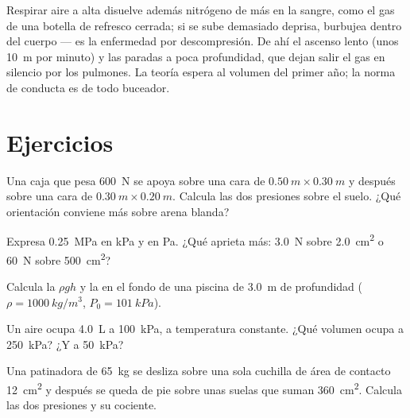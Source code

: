 \begin{remark}[La descompresión]\label{rem:g10:pressure:deco}
Respirar aire a alta  disuelve además nitrógeno de más en la
sangre, como el gas de una botella de refresco cerrada; si se sube
demasiado deprisa, burbujea dentro del cuerpo --- es la enfermedad por
descompresión. De ahí el ascenso lento (unos \qty{10}{m} por minuto) y
las paradas a poca profundidad, que dejan salir el gas en silencio por
los pulmones. La teoría espera al volumen del primer año; la norma de
conducta es de todo buceador.
\end{remark}

\section{Ejercicios}

\begin{exercise}[$\star$]\label{exo:g10:pressure:1}
Una caja que pesa \qty{600}{N} se apoya sobre una cara de
$\qty{0.50}{m} \times \qty{0.30}{m}$ y después sobre una cara de
$\qty{0.30}{m} \times \qty{0.20}{m}$. Calcula las dos presiones sobre el
suelo. ¿Qué orientación conviene más sobre arena blanda?
\end{exercise}

\begin{exercise}[$\star$]\label{exo:g10:pressure:2}
Expresa \qty{0.25}{MPa} en \unit{kPa} y en \unit{Pa}. ¿Qué aprieta más:
\qty{3.0}{N} sobre \qty{2.0}{cm^2} o \qty{60}{N} sobre
\qty{500}{cm^2}?
\end{exercise}

\begin{exercise}[$\star$]\label{exo:g10:pressure:3}
Calcula la  $\rho g h$ y la  en el
fondo de una piscina de \qty{3.0}{m} de profundidad
($\rho = \qty{1000}{kg/m^3}$, $P_0 = \qty{101}{kPa}$).
\end{exercise}

\begin{exercise}[$\star$]\label{exo:g10:pressure:4}
Un aire ocupa \qty{4.0}{L} a \qty{100}{kPa}, a temperatura constante.
¿Qué volumen ocupa a \qty{250}{kPa}? ¿Y a \qty{50}{kPa}?
\end{exercise}

\begin{exercise}[$\star$]\label{exo:g10:pressure:5}
Una patinadora de \qty{65}{kg} se desliza sobre una sola cuchilla de
área de contacto \qty{12}{cm^2} y después se queda de pie sobre unas
suelas que suman \qty{360}{cm^2}. Calcula las dos presiones y su
cociente.
\end{exercise}


